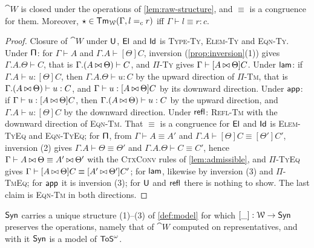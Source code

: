 \begin{lemma}\label{lem:rules-closure}
    $\cat{W}$ is closed under the operations of \cref{lem:raw-structure}, and $\equiv$ is a congruence for them. Moreover, $\star \in \mathsf{Tm}_{\mathcal{W}}(\Gamma, l =_c r)$ iff $\Gamma \vdash l \equiv r : c$.
\end{lemma}

\begin{proof}
    Closure of $\cat{W}$ under $\mathsf{U}$, $\mathsf{El}$ and $\mathsf{Id}$ is \textsc{Type-Ty}, \textsc{Elem-Ty} and \textsc{Eqn-Ty}. Under $\mathsf{\Pi}$: for $\Gamma \vdash A$ and $\Gamma.A \vdash [\Theta]C$, inversion (\cref{prop:inversion}(1)) gives $\Gamma.A.\Theta \vdash C$, that is $\Gamma.(A \mathbin{\bowtie} \Theta) \vdash C$, and \textsc{$\Pi$-Ty} gives $\Gamma \vdash [A \mathbin{\bowtie} \Theta]C$. Under $\mathsf{lam}$: if $\Gamma.A \vdash u : [\Theta]C$, then $\Gamma.A.\Theta \vdash u : C$ by the upward direction of \textsc{$\Pi$-Tm}, that is $\Gamma.(A \mathbin{\bowtie} \Theta) \vdash u : C$, and $\Gamma \vdash u : [A \mathbin{\bowtie} \Theta]C$ by its downward direction. Under $\mathsf{app}$: if $\Gamma \vdash u : [A \mathbin{\bowtie} \Theta]C$, then $\Gamma.(A \mathbin{\bowtie} \Theta) \vdash u : C$ by the upward direction, and $\Gamma.A \vdash u : [\Theta]C$ by the downward direction. Under $\mathsf{refl}$: \textsc{Refl-Tm} with the downward direction of \textsc{Eqn-Tm}. That $\equiv$ is a congruence for $\mathsf{El}$ and $\mathsf{Id}$ is \textsc{Elem-TyEq} and \textsc{Eqn-TyEq}; for $\mathsf{\Pi}$, from $\Gamma \vdash A \equiv A'$ and $\Gamma.A \vdash [\Theta]C \equiv [\Theta']C'$, inversion (2) gives $\Gamma.A \vdash \Theta \equiv \Theta'$ and $\Gamma.A.\Theta \vdash C \equiv C'$, hence $\Gamma \vdash A \mathbin{\bowtie} \Theta \equiv A' \mathbin{\bowtie} \Theta'$ with the \textsc{CtxConv} rules of \cref{lem:admissible}, and \textsc{$\Pi$-TyEq} gives $\Gamma \vdash [A \mathbin{\bowtie} \Theta]C \equiv [A' \mathbin{\bowtie} \Theta']C'$; for $\mathsf{lam}$, likewise by inversion (3) and \textsc{$\Pi$-TmEq}; for $\mathsf{app}$ it is inversion (3); for $\mathsf{U}$ and $\mathsf{refl}$ there is nothing to show. The last claim is \textsc{Eqn-Tm} in both directions.
\end{proof}

\begin{proposition}\label{prop:syn-model}
    $\mathsf{Syn}$ carries a unique structure (1)--(3) of \cref{def:model} for which $[\_] : \mathcal{W} \to \mathsf{Syn}$ preserves the operations, namely that of $\cat{W}$ computed on representatives, and with it $\mathsf{Syn}$ is a model of $\mathsf{ToS}^\omega$.
\end{proposition}

